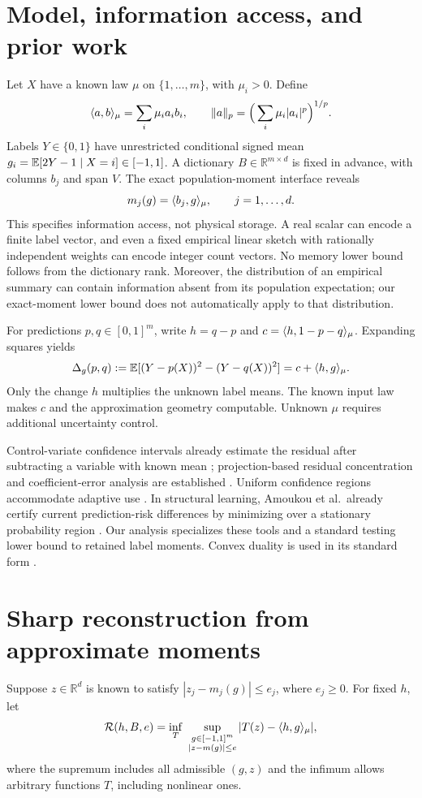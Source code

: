 \section{Model, information access, and prior work}
Let $X$ have a known law $\mu$ on $\{1,\ldots,m\}$, with $\mu_i>0$. Define
\[
 \langle a,b\rangle_\mu=\sum_i\mu_i a_i b_i,\qquad
 \lVert a\rVert_p=\Big(\sum_i\mu_i|a_i|^p\Big)^{1/p}.
\]
Labels $Y\in\{0,1\}$ have unrestricted conditional signed mean
$g_i=\mathbb E[2Y-1\mid X=i]\in[-1,1]$. A dictionary $B\in\mathbb R^{m\times d}$ is fixed in advance, with columns $b_j$ and span $V$. The exact population-moment interface reveals
\[
 m_j(g)=\langle b_j,g\rangle_\mu,\qquad j=1,\ldots,d.
\]
This specifies information access, not physical storage. A real scalar can encode a finite label vector, and even a fixed empirical linear sketch with rationally independent weights can encode integer count vectors. No memory lower bound follows from the dictionary rank. Moreover, the distribution of an empirical summary can contain information absent from its population expectation; our exact-moment lower bound does not automatically apply to that distribution.

For predictions $p,q\in[0,1]^m$, write $h=q-p$ and $c=\langle h,1-p-q\rangle_\mu$. Expanding squares yields
\begin{equation}
 \Delta_g(p,q):=\mathbb E[(Y-p(X))^2-(Y-q(X))^2]=c+\langle h,g\rangle_\mu.
 \label{eq:gain}
\end{equation}
Only the change $h$ multiplies the unknown label means. The known input law makes $c$ and the approximation geometry computable. Unknown $\mu$ requires additional uncertainty control.

Control-variate confidence intervals already estimate the residual after subtracting a variable with known mean \cite{zhao2020}; projection-based residual concentration and coefficient-error analysis are established \cite[Eq.~(6), Theorem~3.1, Appendix~B]{leluc2021}. Uniform confidence regions accommodate adaptive use \cite[Theorem~3, Corollary~1]{abbasi2011}. In structural learning, Amoukou et al.\ already certify current prediction-risk differences by minimizing over a stationary probability region \cite[Lemma~A.13]{amoukou2026}. Our analysis specializes these tools and a standard testing lower bound \cite[Lemma~1]{kaufmann2016} to retained label moments. Convex duality is used in its standard form \cite{boyd2004}.

\section{Sharp reconstruction from approximate moments}
Suppose $z\in\mathbb R^d$ is known to satisfy $|z_j-m_j(g)|\le e_j$, where $e_j\ge0$. For fixed $h$, let
\[
 \mathcal R(h,B,e)=\inf_T\ \sup_{\substack{g\in[-1,1]^m\\|z-m(g)|\le e}}
       |T(z)-\ip hg|,
\]
where the supremum includes all admissible $(g,z)$ and the infimum allows arbitrary functions $T$, including nonlinear ones.

